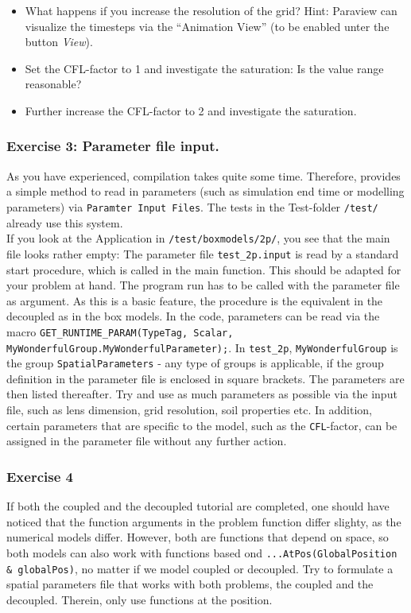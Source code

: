 \begin{itemize}
 \item What happens if you increase the resolution of the grid? Hint: Paraview can visualize the timesteps via the ``Animation View'' (to be enabled unter the button \textit{View}).
 \item Set the CFL-factor to 1 and investigate the saturation: Is the value range reasonable?
 \item Further increase the CFL-factor to 2 and investigate the saturation.
\end{itemize}

\subsubsection{Exercise 3: Parameter file input.}
As you have experienced, compilation takes quite some time. Therefore,  provides a simple method to read in parameters (such as simulation end time or modelling parameters) via \texttt{Paramter Input Files}. The tests in the Test-folder \texttt{/test/} already use this system.\\
If you look at the Application in \texttt{/test/boxmodels/2p/}, you see that the main file looks rather empty: The parameter file \texttt{test\_2p.input} is read by a standard start procedure, which is called in the main function. This should be adapted for your problem at hand. The program run has to be called with the parameter file as argument. As this is a basic \Dumux feature, the procedure is the equivalent in the decoupled as in the box models.
In the code, parameters can be read via the macro \texttt{GET\_RUNTIME\_PARAM(TypeTag, Scalar, MyWonderfulGroup.MyWonderfulParameter);}. In \texttt{test\_2p}, \texttt{MyWonderfulGroup} is the group \texttt{SpatialParameters} - any type of groups is applicable, if the group definition in the parameter file is enclosed in square brackets. The parameters are then listed thereafter. Try and use as much parameters as possible via the input file, such as lens dimension, grid resolution, soil properties etc. In addition, certain parameters that are specific to the model, such as the \texttt{CFL}-factor, can be assigned in the parameter file without any further action.

\subsubsection{Exercise 4}
If both the coupled and the decoupled tutorial are completed, one should have noticed that the function arguments in the problem function differ slighty, as the numerical models differ. However, both are functions that depend on space, so both models can also work with functions based ond \mbox{\texttt{...AtPos(GlobalPosition \& globalPos)}}, no matter if we model coupled or decoupled. Try to formulate a spatial parameters file that works with both problems, the coupled and the decoupled. Therein, only use functions at the position.

